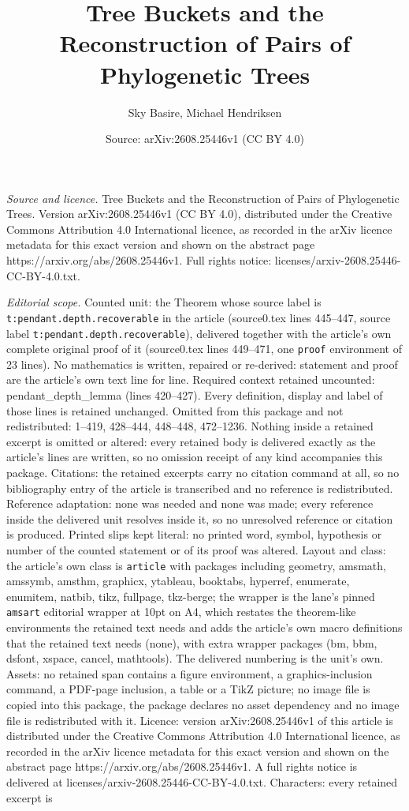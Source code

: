 \documentclass[10pt,a4paper]{amsart}
\title[Tree Buckets and the Reconstruction of Pairs of Phylogenetic]{Tree Buckets and the Reconstruction of Pairs of Phylogenetic Trees}
\author{Sky Basire, Michael Hendriksen}
\date{Source: arXiv:2608.25446v1 (CC BY 4.0)}
\begin{document}
\maketitle

\noindent\emph{Source and licence.} Tree Buckets and the Reconstruction of Pairs of Phylogenetic Trees. Version arXiv:2608.25446v1 (CC BY 4.0), distributed under the Creative Commons Attribution 4.0 International licence, as recorded in the arXiv licence metadata for this exact version and shown on the abstract page https://arxiv.org/abs/2608.25446v1. Full rights notice: licenses/arxiv-2608.25446-CC-BY-4.0.txt.\par\smallskip

\noindent\textit{Editorial scope.} Counted unit: the Theorem whose source label is \texttt{t:pendant.depth.recoverable} in the article (source0.tex lines 445--447, source label \texttt{t:pendant.depth.recoverable}), delivered together with the article's own complete original proof of it (source0.tex lines 449--471, one \texttt{proof} environment of 23 lines). No mathematics is written, repaired or re-derived: statement and proof are the article's own text line for line. Required context retained uncounted: pendant\_depth\_lemma (lines 420--427). Every definition, display and label of those lines is retained unchanged. Omitted from this package and not redistributed: 1--419, 428--444, 448--448, 472--1236. Nothing inside a retained excerpt is omitted or altered: every retained body is delivered exactly as the article's lines are written, so no omission receipt of any kind accompanies this package. Citations: the retained excerpts carry no citation command at all, so no bibliography entry of the article is transcribed and no reference is redistributed. Reference adaptation: none was needed and none was made; every reference inside the delivered unit resolves inside it, so no unresolved reference or citation is produced. Printed slips kept literal: no printed word, symbol, hypothesis or number of the counted statement or of its proof was altered. Layout and class: the article's own class is \texttt{article} with packages including geometry, amsmath, amssymb, amsthm, graphicx, ytableau, booktabs, hyperref, enumerate, enumitem, natbib, tikz, fullpage, tkz-berge; the wrapper is the lane's pinned \texttt{amsart} editorial wrapper at 10pt on A4, which restates the theorem-like environments the retained text needs and adds the article's own macro definitions that the retained text needs (none), with extra wrapper packages (bm, bbm, dsfont, xspace, cancel, mathtools). The delivered numbering is the unit's own. Assets: no retained span contains a figure environment, a graphics-inclusion command, a PDF-page inclusion, a table or a TikZ picture; no image file is copied into this package, the package declares no asset dependency and no image file is redistributed with it. Licence: version arXiv:2608.25446v1 of this article is distributed under the Creative Commons Attribution 4.0 International licence, as recorded in the arXiv licence metadata for this exact version and shown on the abstract page https://arxiv.org/abs/2608.25446v1. A full rights notice is delivered at licenses/arxiv-2608.25446-CC-BY-4.0.txt. Characters: every retained excerpt is 
\end{document}
